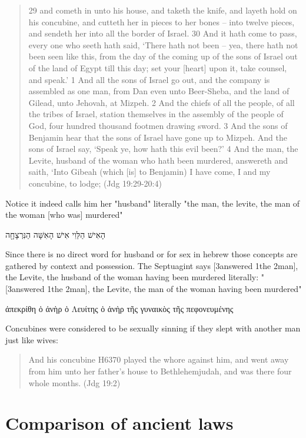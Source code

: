 \documentclass[11pt]{article}
\begin{document}
{\begin{quote}
29 and cometh in unto his house, and taketh the knife, and layeth hold on his concubine, and cutteth her in pieces to her bones -- into twelve pieces, and sendeth her into all the border of Israel.
30 And it hath come to pass, every one who seeth hath said, `There hath not been -- yea, there hath not been seen like this, from the day of the coming up of the sons of Israel out of the land of Egypt till this day; set your [heart] upon it, take counsel, and speak.'
1 And all the sons of Israel go out, and the company is assembled as one man, from Dan even unto Beer-Sheba, and the land of Gilead, unto Jehovah, at Mizpeh.
2 And the chiefs of all the people, of all the tribes of Israel, station themselves in the assembly of the people of God, four hundred thousand footmen drawing sword.
3 And the sons of Benjamin hear that the sons of Israel have gone up to Mizpeh. And the sons of Israel say, `Speak ye, how hath this evil been?'
4 And the man, the Levite, husband of the woman who hath been murdered, answereth and saith, `Into Gibeah (which [is] to Benjamin) I have come, I and my concubine, to lodge;
(Jdg 19:29-20:4)
\end{quote}

Notice it indeed calls him her "husband" literally "the man, the levite, the man of the woman [who was] murdered"
\begin{hebrew}
הָאִישׁ הַלֵּוִי אִישׁ הָאִשָּׁה הַנִּרְצָחָ֖ה

\end{hebrew}
Since there is no direct word for husband or for sex in hebrew those concepts are gathered by context and possession. The Septuagint says [3answered 1the 2man], the Levite, the husband of the woman having been murdered
literally: "[3answered 1the 2man], the Levite, the man of the woman having been murdered"

\begin{greek}
 ἀπεκρίθη ὁ ἀνὴρ ὁ Λευίτης ὁ ἀνὴρ τῆς γυναικὸς τῆς πεφονευμένης
\end{greek}


Concubines were considered to be sexually sinning if they slept with another man just like wives:
\begin{quote}
And his concubine H6370 played the whore against him, and went away from him unto her father's house to Bethlehemjudah, and was there four whole months. (Jdg 19:2)
\end{quote}

\section{Comparison of ancient laws}


}
\end{document}
